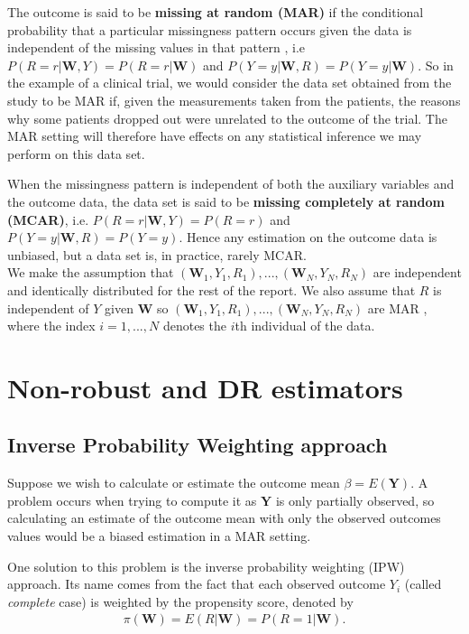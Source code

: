 \documentclass[12pt,twoside]{article}
\begin{document}
The outcome is said to be \textbf{missing at random (MAR)} if the conditional probability that a particular missingness pattern occurs given the data is independent of the missing values in that pattern \citep{vansteelandt}, i.e $P(R=r|\mathbf{W}, Y) = P(R= r|\mathbf{W})$ and  $P(Y=y|\mathbf{W}, R) = P(Y=y|\mathbf{W})$. So in the example of a clinical trial, we would consider the data set obtained from the study to be MAR if, given the measurements taken from the patients, the reasons why some patients dropped out were unrelated to the outcome of the trial. The MAR setting will therefore have effects on any statistical inference we may perform on this data set.

When the missingness pattern is independent of both the auxiliary variables and the outcome data, the data set is said to be \textbf{missing completely at random (MCAR)}, i.e. $P(R=r|\mathbf{W}, Y) = P(R = r)$ and  $P(Y=y|\mathbf{W}, R) = P(Y=y)$. Hence any estimation on the outcome data is unbiased, but a data set is, in practice, rarely MCAR.\\

We make the assumption that $(\mathbf{W}_1, Y_1, R_1),...,(\mathbf{W}_N, Y_N, R_N)$ are independent and identically distributed for the rest of the report. We also assume that $R$ is independent of $Y$ given $\mathbf{W}$ so $(\mathbf{W}_1, Y_1, R_1), ... ,(\mathbf{W}_N, Y_N, R_N)$ are MAR \citep{vansteelandt}, where the index $i = 1,...,N$ denotes the $i$th individual of the data.\\

\section{Non-robust and DR estimators}

\subsection{Inverse Probability Weighting approach}

Suppose we wish to calculate or estimate the outcome mean $\beta = E(\mathbf{Y})$. A problem occurs when trying to compute it as $\mathbf{Y}$ is only partially observed, so calculating an estimate of the outcome mean with only the observed outcomes values would be a biased estimation in a MAR setting.

One solution to this problem is the inverse probability weighting (IPW) approach. Its name comes from the fact that each observed outcome $Y_i$ (called \textit{complete} case) is weighted by the propensity score, denoted by
\begin{align*}
    \pi(\mathbf{W})= E(R|\mathbf{W}) = P(R = 1|\mathbf{W}).
\end{align*}
\end{document}
